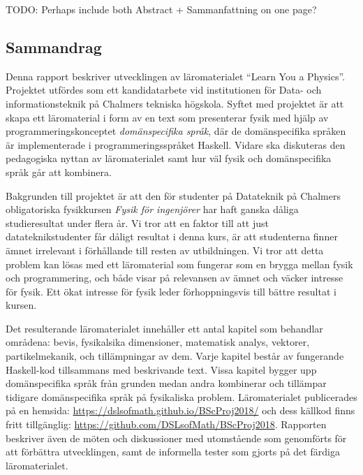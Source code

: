 
\thispagestyle{plain}			%

TODO: Perhaps include both Abstract + Sammanfattning on one page?

\begin{binge}

\section*{Sammandrag}

Denna rapport beskriver utvecklingen av läromaterialet ``Learn You a
Physics''. Projektet utfördes som ett kandidatarbete vid institutionen
för Data- och informationsteknik på Chalmers tekniska högskola. Syftet
med projektet är att skapa ett läromaterial i form av en text som
presenterar fysik med hjälp av programmeringskonceptet
\textit{domänspecifika språk}, där de domänspecifika språken är
implementerade i programmeringsspråket Haskell. Vidare ska diskuteras
den pedagogiska nyttan av läromaterialet samt hur väl fysik och
domänspecifika språk går att kombinera.

Bakgrunden till projektet är att den för studenter på Datateknik på
Chalmers obligatoriska fysikkursen \textit{Fysik för ingenjörer} har
haft ganska dåliga studieresultat under flera år. Vi tror att en
faktor till att just datateknikstudenter får dåligt resultat i denna
kurs, är att studenterna finner ämnet irrelevant i förhållande till
resten av utbildningen. Vi tror att detta problem kan lösas med ett
läromaterial som fungerar som en brygga mellan fysik och
programmering, och både visar på relevansen av ämnet och väcker
intresse för fysik. Ett ökat intresse för fysik leder förhoppningsvis
till bättre resultat i kursen.

Det resulterande läromaterialet innehåller ett antal kapitel som
behandlar områdena: bevis, fysikalsika dimensioner, matematisk analys,
vektorer, partikelmekanik, och tillämpningar av dem. Varje kapitel
består av fungerande Haskell-kod tillsammans med beskrivande
text. Vissa kapitel bygger upp domänspecifika språk från grunden medan
andra kombinerar och tillämpar tidigare domänspecifika språk på
fysikaliska problem. Läromaterialet publicerades på en hemsida:
\url{https://dslsofmath.github.io/BScProj2018/} och dess källkod finns
fritt tillgänglig:
\url{https://github.com/DSLsofMath/BScProj2018}. Rapporten beskriver
även de möten och diskussioner med utomstående som genomförts för att
förbättra utvecklingen, samt de informella tester som gjorts på det
färdiga läromaterialet.


\end{binge}
